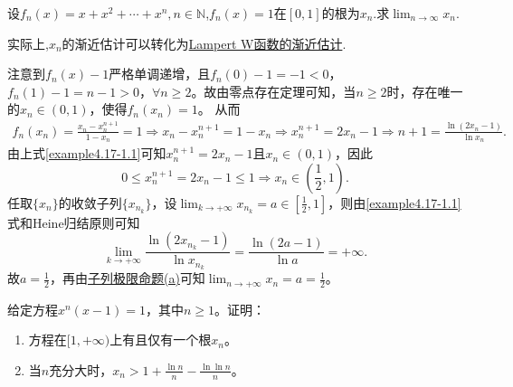 \documentclass[../../main.tex]{subfiles}%
\begin{document}
\begin{example}
设\(f_n(x)=x + x^2+\cdots+x^n,n\in\mathbb{N}\),\(f_n(x)=1\)在\([0,1]\)的根为\(x_n\).求\(\lim_{n\rightarrow\infty}x_n\).
\end{example}
\begin{note}
实际上,$x_n$的渐近估计可以转化为\hyperref[proposition:Lampert W 函数的渐近估计]{Lampert W函数的渐近估计}.
\end{note}
\begin{solution}

注意到\(f_n(x) - 1\)严格单调递增，且\(f_n(0) - 1 = -1 < 0\)，\(f_n(1) - 1 = n - 1 > 0\)，\(\forall n\geqslant 2\)。故由零点存在定理可知，当\(n\geqslant 2\)时，存在唯一的\(x_n\in(0, 1)\)，使得\(f_n(x_n) = 1\)。
从而
\begin{align}\label{example4.17-1.1}
f_n(x_n)=\frac{x_n - x_{n}^{n + 1}}{1 - x_n}=1\Rightarrow x_n - x_{n}^{n + 1}=1 - x_n\Rightarrow x_{n}^{n + 1}=2x_n - 1\Rightarrow n + 1=\frac{\ln(2x_n - 1)}{\ln x_n}.  
\end{align}
由上式\eqref{example4.17-1.1}可知\(x_{n}^{n + 1}=2x_n - 1\)且\(x_n\in(0, 1)\)，因此
\[
0\leqslant x_{n}^{n + 1}=2x_n - 1\leqslant 1\Rightarrow x_n\in\left(\frac{1}{2}, 1\right).
\]
任取\(\{x_n\}\)的收敛子列\(\{x_{n_k}\}\)，设\(\lim_{k\rightarrow +\infty}x_{n_k}=a\in\left[\frac{1}{2}, 1\right]\)，则由\eqref{example4.17-1.1}式和Heine归结原则可知
\[
\lim_{k\rightarrow +\infty}\frac{\ln(2x_{n_k} - 1)}{\ln x_{n_k}}=\frac{\ln(2a - 1)}{\ln a}=+\infty.
\]
故\(a = \frac{1}{2}\)，再由\hyperref[proposition:子列极限命题]{子列极限命题(a)}可知\(\lim_{n\rightarrow +\infty}x_n=a=\frac{1}{2}\)。

\end{solution}

\begin{example}
给定方程$x^n(x-1)=1$，其中$n\geqslant 1$。证明：
\begin{enumerate}[(1)]
\item 方程在$[1,+\infty)$上有且仅有一个根$x_n$。
\item 当$n$充分大时，$x_n > 1+\frac{\ln n}{n}-\frac{\ln\ln n}{n}$。
\end{enumerate}
\end{example}
\end{document}
